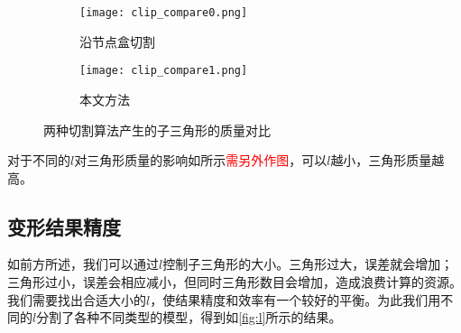 \begin{figure}[htbp]
	\centering
	\begin{subfigure}[b]{.4\textwidth}
		\centering
		\texttt{[image: clip\_compare0.png]}
		\caption{沿节点盒切割}\label{subfig:clip_compare0}
	\end{subfigure}%
	\begin{subfigure}[b]{.4\textwidth}
		\centering
		\texttt{[image: clip\_compare1.png]}
		\caption{本文方法}\label{subfig:clip_compare1}
	\end{subfigure}
	\caption{两种切割算法产生的子三角形的质量对比}\label{fig:triangle_quality_compare}
\end{figure}

对于不同的$l$对三角形质量的影响如所示\textcolor{red}{需另外作图}，可以$l$越小，三角形质量越高。

\subsection{变形结果精度}
如前方所述，我们可以通过$l$控制子三角形的大小。三角形过大，误差就会增加；三角形过小，误差会相应减小，但同时三角形数目会增加，造成浪费计算的资源。我们需要找出合适大小的$l$，使结果精度和效率有一个较好的平衡。为此我们用不同的$l$分割了各种不同类型的模型，得到如\autoref{fig:l}所示的结果。

